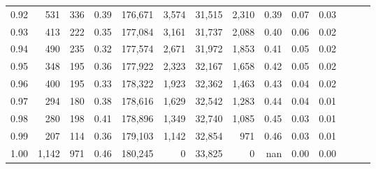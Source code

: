 \begin{tabular}{rrrrrrrrrrrrrr}
0.92 &    531 &  336 &  0.39 &  176,671 &    3,574 &  31,515 &   2,310 &  0.39 &  0.07 &      0.03 \\
0.93 &    413 &  222 &  0.35 &  177,084 &    3,161 &  31,737 &   2,088 &  0.40 &  0.06 &      0.02 \\
0.94 &    490 &  235 &  0.32 &  177,574 &    2,671 &  31,972 &   1,853 &  0.41 &  0.05 &      0.02 \\
0.95 &    348 &  195 &  0.36 &  177,922 &    2,323 &  32,167 &   1,658 &  0.42 &  0.05 &      0.02 \\
0.96 &    400 &  195 &  0.33 &  178,322 &    1,923 &  32,362 &   1,463 &  0.43 &  0.04 &      0.02 \\
0.97 &    294 &  180 &  0.38 &  178,616 &    1,629 &  32,542 &   1,283 &  0.44 &  0.04 &      0.01 \\
0.98 &    280 &  198 &  0.41 &  178,896 &    1,349 &  32,740 &   1,085 &  0.45 &  0.03 &      0.01 \\
0.99 &    207 &  114 &  0.36 &  179,103 &    1,142 &  32,854 &     971 &  0.46 &  0.03 &      0.01 \\
1.00 &  1,142 &  971 &  0.46 &  180,245 &        0 &  33,825 &       0 &   nan &  0.00 &      0.00 \\
\bottomrule
\end{tabular}
